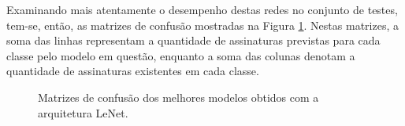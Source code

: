 Examinando mais atentamente o desempenho destas redes no conjunto de testes, tem-se, então, as matrizes de confusão mostradas na Figura \ref{fig:matrizes-lenet}. Nestas matrizes, a soma das linhas representam a quantidade de assinaturas previstas para cada classe pelo modelo em questão, enquanto a soma das colunas denotam a quantidade de assinaturas existentes em cada classe.

\begin{figure}[h]
	\centering
	\caption{Matrizes de confusão dos melhores modelos obtidos com a arquitetura LeNet.}\label{fig:matrizes-lenet}
	\hfill
\end{figure}


